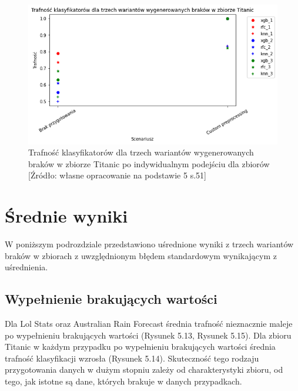 \documentclass[oneside]{book}
\begin{document}
\begin{figure}[H]
    \centerline{\includegraphics[scale=0.8]{Titanic_Custom}}
    \centering
    \caption{Trafność klasyfikatorów 
    dla trzech wariantów wygenerowanych 
    braków w zbiorze Titanic po 
    indywidualnym podejściu dla zbiorów
    [Źródło: własne opracowanie na podstawie 5 s.51]}
    \end{figure}




\section{Średnie wyniki}

W poniższym podrozdziale przedstawiono uśrednione wyniki
 z trzech wariantów braków w zbiorach z uwzględnionym błędem 
 standardowym wynikającym z uśrednienia.

\subsection{Wypełnienie brakujących wartości}


Dla Lol Stats oraz Australian Rain Forecast średnia trafność nieznacznie maleje po wypełnieniu brakujących wartości (Rysunek 5.13, Rysunek 5.15). 
Dla zbioru Titanic w każdym przypadku po wypełnieniu brakujących wartości średnia trafność klasyfikacji wzrosła (Rysunek 5.14). Skuteczność tego rodzaju
przygotowania danych w dużym stopniu zależy 
od charakterystyki zbioru, od tego, 
jak istotne są dane, których brakuje w danych przypadkach.
\end{document}
